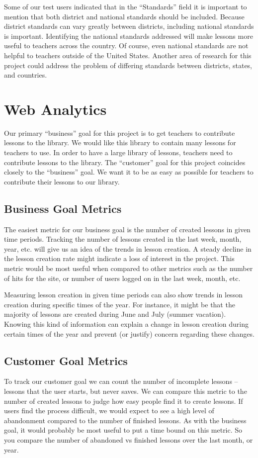 \documentclass[10pt,letter]{article}
\begin{document}
Some of our test users indicated that in the ``Standards'' field it is important
to mention that both district and national standards should be included. Because
district standards can vary greatly between districts, including national
standards is important. Identifying the national standards addressed will make
lessons more useful to teachers across the country. Of course, even national
standards are not helpful to teachers outside of the United States. Another area
of research for this project could address the problem of differing standards
between districts, states, and countries.

\section{Web Analytics}
Our primary ``business'' goal for this project is to get teachers to contribute
lessons to the library. We would like this library to contain many lessons for
teachers to use. In order to have a large library of lessons, teachers need to
contribute lessons to the library. The ``customer'' goal for this project
coincides closely to the ``business'' goal. We want it to be as easy as possible
for teachers to contribute their lessons to our library.

\subsection{Business Goal Metrics}
The easiest metric for our business goal is the number of created lessons in
given time periods. Tracking the number of lessons created in the last week,
month, year, etc. will give us an idea of the trends in lesson creation. A
steady decline in the lesson creation rate might indicate a loss of interest in
the project. This metric would be most useful when compared to other metrics
such as the number of hits for the site, or number of users logged on in the
last week, month, etc.

Measuring lesson creation in given time periods can also show trends in lesson
creation during specific times of the year. For instance, it might be that the
majority of lessons are created during June and July (summer vacation). Knowing
this kind of information can explain a change in lesson creation during certain
times of the year and prevent (or justify) concern regarding these changes.

\subsection{Customer Goal Metrics}
To track our customer goal we can count the number of incomplete lessons --
lessons that the user starts, but never saves. We can compare this metric to the
number of created lessons to judge how easy people find it to create lessons.
If users find the process difficult, we would expect to see a high level of
abandonment compared to the number of finished lessons. As with the business
goal, it would probably be most useful to put a time bound on this metric. So
you compare the number of abandoned vs finished lessons over the last month, or
year.
\end{document}
